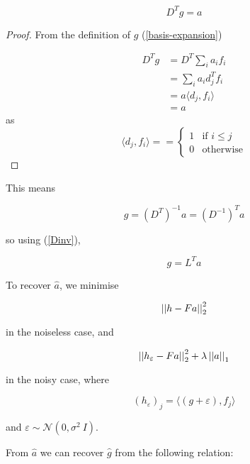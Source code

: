 \begin{theorem}
\begin{equation}
D^Tg = a
\end{equation}
\end{theorem}
\begin{proof}
From the definition of \(g\) (\ref{basis-expansion})

\begin{align}
D^Tg &= D^T \sum_i a_i f_i \\
&= \sum_i a_i d_j^T f_i \\
&= a \langle d_j, f_i\rangle \\
&= a
\end{align}
as
\begin{equation}
\langle d_j, f_i \rangle = =
\begin{cases}
1 & \text{if } i \leq j \\
0 & \text{otherwise} 
\end{cases}
\end{equation}
\end{proof}

This means 

\begin{equation}
g = \left(D^T\right)^{-1} a =\left(D^{-1}\right)^T a
\end{equation}

so using (\ref{Dinv}), 

\begin{equation}
g = L^T a
\end{equation}

To recover \(\hat{a}\), we minimise

\begin{equation}
\left|\left|h - Fa\right|\right|_2^2
\end{equation}

in the noiseless case, and

\begin{equation}
\left|\left|h_\varepsilon - Fa\right|\right|_2^2 + \lambda\left|\left|a\right|\right|_1
\label{recon}
\end{equation}

in the noisy case, where 

\begin{equation}
\left(h_\varepsilon\right)_j = \langle\left(g+\varepsilon\right), f_j\rangle
\end{equation}

and \(\varepsilon \sim \mathcal{N}(0,\sigma^2\ I)\).

From \(\hat{a}\) we can recover \(\hat{g}\) from the following relation:


